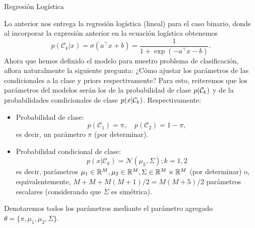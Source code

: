\documentclass[9pt, handout]{beamer}
\begin{document}
\begin{frame}{Regresión Logística}

Lo anterior nos entrega la regresión logística (lineal) para el  caso binario, donde al incorporar la expresión anterior en la ecuación logística obtenemos
\begin{equation*}
  p(\mathcal{C}_k|x) = \sigma(a^\top x+b) = \frac{1}{1 + \exp{\left(-a^\top x-b\right)}}.
\end{equation*} \pause
Ahora que hemos definido el modelo para nuestro problema de clasificación, aflora naturalmente la siguiente pregunta: ¿Cómo ajustar los parámetros de las condicionales a la clase y priors respectivamente? Para esto, reiteremos que los parámetros del modelos serán los de la probabilidad de clase $p({\mathcal C}_k)$ y de la probabilidades condicionales de clase $p(x|{\mathcal C}_k)$. Respectivamente: \pause

\begin{itemize}
  \item Probabilidad de clase:
  \begin{equation*}
    p(\mathcal{C}_1)=\pi,\quad  p(\mathcal{C}_2)=1-\pi,
   \end{equation*}  es decir,  un parámetro $\pi$ (por determinar). \pause
  \item Probabilidad condicional de clase:
  \begin{equation*}
    p(x|\mathcal{C}_k) = \mathcal{N}(\mu_k,  \Sigma); k=1,2
  \end{equation*} 
  es decir, parámetros $ \mu_1\in\mathbb{R}^M,\mu_2\in\mathbb{R}^M,\Sigma\in\mathbb{R}^M\times\mathbb{R}^M$ (por determinar) o, equivalentemente, $M + M + M(M+1)/2=M(M+5)/2$ parámetros escalares (considerando que $\Sigma$ es simétrica). 
\end{itemize}
\pause
Denotaremos todos los parámetros mediante el parámetro agregado $\theta =\{\pi,\mu_1,\mu_2,\Sigma \}$.
\end{frame}
\end{document}
